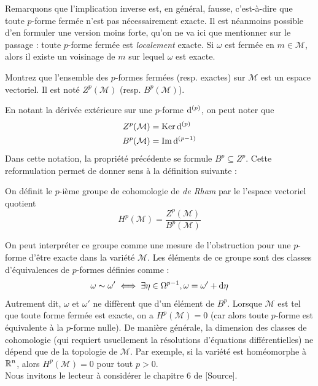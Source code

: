 Remarquons que l'implication inverse est, en général, fausse, c'est-à-dire que toute $p$-forme fermée n'est pas nécessairement exacte. Il est néanmoins possible d'en formuler une version moins forte, qu'on ne va ici que mentionner sur le passage : toute $p$-forme fermée est \emph{localement} exacte. Si $\omega $ est fermée en $m\in\mathcal{M}$, alors il existe un voisinage de $m$ sur lequel $\omega $ est exacte.
\begin{exerc}
    Montrez que l'ensemble des $p$-formes fermées (resp. exactes) sur $\mathcal{M}$ est un espace vectoriel. Il est noté $Z^p(\mathcal{M})$ (resp. $B^p(\mathcal{M})$).
\end{exerc}
En notant la dérivée extérieure sur une $p$-forme $\mathrm{d}^{(p)}$, on peut noter que
\begin{align}
    Z^p(\mathcal{M}) &= \mathrm{Ker} \, \mathrm{d}^{(p)}\\
    B^p(\mathcal{M}) &= \mathrm{Im} \, \mathrm{d}^{(p-1)}
\end{align}
Dans cette notation, la propriété précédente se formule $B^p \subseteq Z^p$. Cette reformulation permet de donner sens à la définition suivante :
\begin{theoremframe}
    \begin{defi}
        On définit le $p$-ième groupe de cohomologie de \emph{de Rham} par le l'espace vectoriel quotient 
        \begin{equation}
            H^p(\mathcal{M}) = \frac{Z^p(\mathcal{M})}{B^p(\mathcal{M})}
        \end{equation}
    \end{defi}
\end{theoremframe}
On peut interpréter ce groupe comme une mesure de l'obstruction pour une $p$-forme d'être exacte dans la variété $\mathcal{M}$. Les éléments de ce groupe sont des classes d'équivalences de $p$-formes définies comme :
\begin{equation}
    \omega  \sim \omega ' \iff \exists \eta \in \Omega^{p-1}, \omega  = \omega ' + \mathrm{d} \eta
\end{equation}
Autrement dit, $\omega $ et $\omega '$ ne diffèrent que d'un élément de $B^p$. Lorsque $\mathcal{M}$ est tel que toute forme fermée est exacte, on a $H^p(\mathcal{M})=0$ (car alors toute $p$-forme est équivalente à la $p$-forme nulle). De manière générale, la dimension des classes de cohomologie (qui requiert usuellement la résolutions d'équations différentielles) ne dépend que de la topologie de $\mathcal{M}$. Par exemple, si la variété est homéomorphe à $\mathbb{R}^n$, alors $H^p(\mathcal{M}) = 0$ pour tout $p>0$.\\
Nous invitons le lecteur à considérer le chapitre 6 de [Source].

